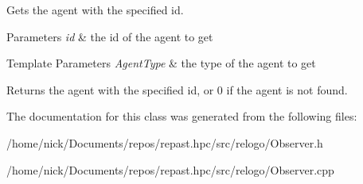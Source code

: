 Gets the agent with the specified id. 


\begin{DoxyParams}{Parameters}
{\em id} & the id of the agent to get \\
\hline
\end{DoxyParams}

\begin{DoxyTemplParams}{Template Parameters}
{\em Agent\-Type} & the type of the agent to get\\
\hline
\end{DoxyTemplParams}
\begin{DoxyReturn}{Returns}
the agent with the specified id, or 0 if the agent is not found. 
\end{DoxyReturn}


The documentation for this class was generated from the following files\-:\begin{DoxyCompactItemize}
\item 
/home/nick/\-Documents/repos/repast.\-hpc/src/relogo/Observer.\-h\item 
/home/nick/\-Documents/repos/repast.\-hpc/src/relogo/Observer.\-cpp\end{DoxyCompactItemize}
